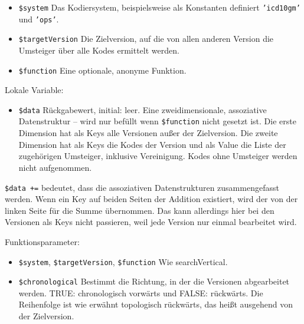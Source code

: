 \begin{itemize}
\item \texttt{\$system} \newline Das Kodiersystem, beispielsweise als Konstanten definiert \texttt{'icd10gm'} und \texttt{'ops'}. 
\item \texttt{\$targetVersion} \newline Die Zielversion, auf die von allen anderen Version die Umsteiger über alle Kodes ermittelt werden.
\item \texttt{\$function} \newline Eine optionale, anonyme Funktion.
\end{itemize}

Lokale Variable:

\begin{itemize}
\item \texttt{\$data} \hspace{2em} Rückgabewert, initial: leer.
\newline Eine zweidimensionale, assoziative Datenstruktur -- wird nur befüllt wenn \texttt{\$function} nicht gesetzt ist. Die erste Dimension hat als Keys alle Versionen außer der Zielversion. Die zweite Dimension hat als Keys die Kodes der Version und als Value die Liste der zugehörigen Umsteiger, inklusive Vereinigung. Kodes ohne Umsteiger werden nicht aufgenommen.
\end{itemize}



\texttt{\$data +=} bedeutet, dass die assoziativen Datenstrukturen zusammengefasst werden. Wenn ein Key auf beiden Seiten der Addition existiert, wird der von der linken Seite für die Summe übernommen. Das kann allerdings hier bei den Versionen als Keys nicht passieren, weil jede Version nur einmal bearbeitet wird. 


Funktionsparameter:

\begin{itemize}
\item \texttt{\$system}, \texttt{\$targetVersion}, \texttt{\$function}  \newline Wie searchVertical. 
\item \texttt{\$chronological}
\newline Bestimmt die Richtung, in der die Versionen abgearbeitet werden. TRUE: chronologisch vorwärts und FALSE: rückwärts. Die Reihenfolge ist wie erwähnt topologisch rückwärts, das heißt ausgehend von der Zielversion. 
\end{itemize}

